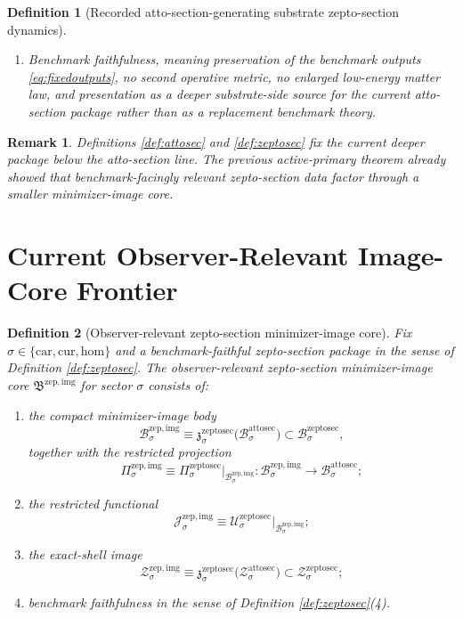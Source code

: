 \documentclass[11pt]{article}
\newcommand{\Car}{\mathrm{car}}
\newcommand{\Cur}{\mathrm{cur}}
\newcommand{\Hom}{\mathrm{hom}}
\newcommand{\AttoSectionBody}[1]{\mathcal B_{#1}^{\mathrm{attosec}}}
\newcommand{\AttoSectionShell}[1]{\mathcal Z_{#1}^{\mathrm{attosec}}}
\newcommand{\ZeptoSectionBody}[1]{\mathcal B_{#1}^{\mathrm{zeptosec}}}
\newcommand{\ZeptoSectionProj}[1]{\Pi_{#1}^{\mathrm{zeptosec}}}
\newcommand{\ZeptoSectionFiber}[2]{\mathcal F_{#1}^{\mathrm{zeptosec}}(#2)}
\newcommand{\ZeptoSectionAttoMin}[1]{\mathfrak z_{#1}^{\mathrm{zeptosec}}}
\newcommand{\ZeptoSectionFunctional}[1]{\mathscr U_{#1}^{\mathrm{zeptosec}}}
\newcommand{\ZeptoSectionShell}[1]{\mathcal Z_{#1}^{\mathrm{zeptosec}}}
\newcommand{\ZeptoImageCore}{\mathfrak B^{\mathrm{zep,img}}}
\newcommand{\ZeptoImgBody}[1]{\mathcal B_{#1}^{\mathrm{zep,img}}}
\newcommand{\ZeptoImgProj}[1]{\Pi_{#1}^{\mathrm{zep,img}}}
\newcommand{\ZeptoImgFunctional}[1]{\mathscr J_{#1}^{\mathrm{zep,img}}}
\newcommand{\ZeptoImgShell}[1]{\mathcal Z_{#1}^{\mathrm{zep,img}}}
\newtheorem{definition}{Definition}
\newtheorem{remark}{Remark}
\begin{document}
\begin{definition}[Recorded atto-section-generating substrate zepto-section dynamics]
\begin{enumerate}
\[\begin{array}{l}
    \ZeptoSectionFunctional{\sigma}(q)
    =
    \displaystyle\min_{r\in\ZeptoSectionFiber{\sigma}{\ZeptoSectionProj{\sigma}(q)}}
    \ZeptoSectionFunctional{\sigma}(r)
    \end{array}
    \right\},
    \]
    and
    \[
    \ZeptoSectionProj{\sigma}\big|_{\ZeptoSectionShell{\sigma}}
    :
    \ZeptoSectionShell{\sigma}\xrightarrow{\cong}\AttoSectionShell{\sigma}
    \]
    is a diffeomorphism.
    \item Benchmark faithfulness, meaning preservation of the benchmark outputs \eqref{eq:fixedoutputs}, no second operative metric, no enlarged low-energy matter law, and presentation as a deeper substrate-side source for the current atto-section package rather than as a replacement benchmark theory.
\end{enumerate}
\end{definition}

\begin{remark}
Definitions \ref{def:attosec} and \ref{def:zeptosec} fix the current deeper package below the atto-section line. The previous active-primary theorem already showed that benchmark-facingly relevant zepto-section data factor through a smaller minimizer-image core.
\end{remark}

\section{Current Observer-Relevant Image-Core Frontier}

\begin{definition}[Observer-relevant zepto-section minimizer-image core]
\label{def:imagecore}
Fix \(\sigma\in\{\Car,\Cur,\Hom\}\) and a benchmark-faithful zepto-section package in the sense of Definition \ref{def:zeptosec}. The \emph{observer-relevant zepto-section minimizer-image core} \(\ZeptoImageCore\) for sector \(\sigma\) consists of:
\begin{enumerate}
    \item the compact minimizer-image body
    \[
    \ZeptoImgBody{\sigma}
    \equiv
    \ZeptoSectionAttoMin{\sigma}\bigl(\AttoSectionBody{\sigma}\bigr)
    \subset
    \ZeptoSectionBody{\sigma},
    \]
    together with the restricted projection
    \[
    \ZeptoImgProj{\sigma}
    \equiv
    \ZeptoSectionProj{\sigma}\big|_{\ZeptoImgBody{\sigma}}
    :
    \ZeptoImgBody{\sigma}\to\AttoSectionBody{\sigma};
    \]
    \item the restricted functional
    \[
    \ZeptoImgFunctional{\sigma}
    \equiv
    \ZeptoSectionFunctional{\sigma}\big|_{\ZeptoImgBody{\sigma}};
    \]
    \item the exact-shell image
    \[
    \ZeptoImgShell{\sigma}
    \equiv
    \ZeptoSectionAttoMin{\sigma}\bigl(\AttoSectionShell{\sigma}\bigr)
    \subset
    \ZeptoSectionShell{\sigma};
    \]
    \item benchmark faithfulness in the sense of Definition \ref{def:zeptosec}(4).
\end{enumerate}
\end{definition}
\end{document}
